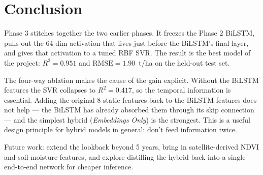 \documentclass[conference]{IEEEtran}
\begin{document}
\section{Conclusion}
\label{sec:conclusion}

Phase 3 stitches together the two earlier phases. It freezes the Phase 2 BiLSTM, pulls out the 64-dim activation that lives just before the BiLSTM's final layer, and gives that activation to a tuned RBF SVR. The result is the best model of the project: $R^{2}=0.951$ and $\text{RMSE}=1.90$~t/ha on the held-out test set.

The four-way ablation makes the cause of the gain explicit. Without the BiLSTM features the SVR collapses to $R^{2}=0.417$, so the temporal information is essential. Adding the original 8 static features back to the BiLSTM features does not help — the BiLSTM has already absorbed them through its skip connection — and the simplest hybrid (\emph{Embeddings Only}) is the strongest. This is a useful design principle for hybrid models in general: don't feed information twice.

Future work: extend the lookback beyond 5 years, bring in satellite-derived NDVI and soil-moisture features, and explore distilling the hybrid back into a single end-to-end network for cheaper inference.
\end{document}
